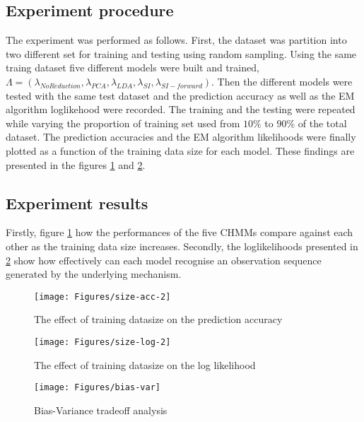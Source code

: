 \subsection{Experiment procedure}
The experiment was performed as follows.
First, the dataset was partition into two different set for training and testing using random sampling.
Using the same traing dataset five different models were built and trained, \(\Lambda = (\lambda_{No Reduction}, \lambda_{PCA}, \lambda_{LDA}, \lambda_{SI}, \lambda_{SI-forward})\).
Then the different models were tested with the same test dataset and the prediction accuracy as well as the EM algorithm loglikehood were recorded.
The training and the testing were repeated while varying the proportion of training set used from \(10\%\) to \(90\%\) of the total dataset.
The prediction accuracies and the EM algorithm likelihoods were finally plotted as a function of the training data size for each model.
These findings are presented in the figures \ref{fig:size-acc} and \ref{fig:size-log}. 

\subsection{Experiment results}
Firstly, figure \ref{fig:size-acc} how the performances of the five CHMMs compare against each other as the training data size increases.
Secondly, the loglikelihoods presented in \ref{fig:size-log} show how effectively can each model recognise an observation sequence generated by the underlying mechanism.

\begin{figure}[ht!]
	\texttt{[image: Figures/size-acc-2]}
	\caption{The effect of training datasize on the prediction accuracy}
	\label{fig:size-acc}
\end{figure}

\begin{figure}[ht!]
	\texttt{[image: Figures/size-log-2]}
	\caption{The effect of training datasize on the log likelihood}
	\label{fig:size-log}
\end{figure}

\begin{figure}[ht!]
	\centering
	\texttt{[image: Figures/bias-var]}
	\caption{Bias-Variance tradeoff analysis}
	\label{fig:bias-var}
\end{figure}


\begin{figure}[ht!]
\end{figure}


